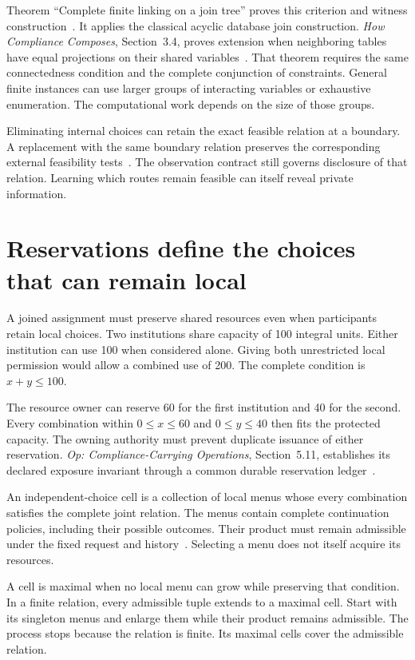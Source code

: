 \documentclass{momentum}
\begin{document}
Theorem ``Complete finite linking on a join tree'' proves this criterion and witness construction~\cite[Section~4.1]{linking}.
It applies the classical acyclic database join construction.
\emph{How Compliance Composes}, Section~3.4, proves extension when neighboring tables have equal projections on their shared variables~\cite{compliance}.
That theorem requires the same connectedness condition and the complete conjunction of constraints.
General finite instances can use larger groups of interacting variables or exhaustive enumeration.
The computational work depends on the size of those groups.

Eliminating internal choices can retain the exact feasible relation at a boundary.
A replacement with the same boundary relation preserves the corresponding external feasibility tests~\cite[Sections~5--6]{linking}.
The observation contract still governs disclosure of that relation.
Learning which routes remain feasible can itself reveal private information.

\section{Reservations define the choices that can remain local}
\label{sec:reservations}

A joined assignment must preserve shared resources even when participants retain local choices. Two institutions share capacity of 100 integral units.
Either institution can use 100 when considered alone.
Giving both unrestricted local permission would allow a combined use of 200.
The complete condition is $x+y\le100$.

The resource owner can reserve 60 for the first institution and 40 for the second.
Every combination within $0\le x\le60$ and $0\le y\le40$ then fits the protected capacity.
The owning authority must prevent duplicate issuance of either reservation.
\emph{Op: Compliance-Carrying Operations}, Section~5.11, establishes its declared exposure invariant through a common durable reservation ledger~\cite{op}.

An independent-choice cell is a collection of local menus whose every combination satisfies the complete joint relation.
The menus contain complete continuation policies, including their possible outcomes.
Their product must remain admissible under the fixed request and history~\cite[Section~8]{linking}.
Selecting a menu does not itself acquire its resources.

A cell is maximal when no local menu can grow while preserving that condition.
In a finite relation, every admissible tuple extends to a maximal cell.
Start with its singleton menus and enlarge them while their product remains admissible.
The process stops because the relation is finite. Its maximal cells cover the admissible relation.
\end{document}
